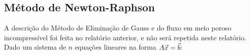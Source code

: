 \documentclass[final,5p]{elsarticle}
\numberwithin{equation}{section}
\newcommand*{\squareb}{\textcolor{black}{\rule{0.5em}{0.5em}}}
\newcommand*{\squareg}{\textcolor{gray}{\rule{0.5em}{0.5em}}}
\begin{document}

    \subsection{Método de Newton-Raphson}

        A descrição do Método de Eliminação de Gauss e do fluxo em meio poroso incompressível foi feita no relatório anterior\cite{relatoriogauss}, e não será repetida neste relatório.
        Dado um sistema de $n$ equações lineares na forma $\\A \vec{x} = \vec{b}$:
\end{document}
